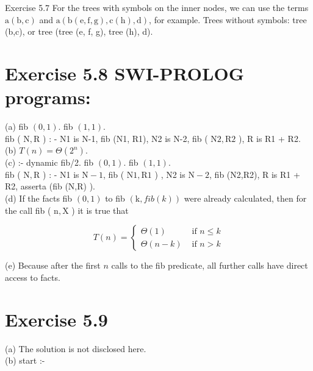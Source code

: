 \documentclass[10pt]{article}
\begin{document}
Exercise 5.7 For the trees with symbols on the inner nodes, we can use the terms $\mathrm{a}(\mathrm{b}, \mathrm{c})$ and $\mathrm{a}(\mathrm{b}(\mathrm{e}, \mathrm{f}, \mathrm{g}), \mathrm{c}(\mathrm{h}), \mathrm{d})$, for example. Trees without symbols: tree (b,c), or tree (tree (e, f, g), tree (h), d).

\section*{Exercise 5.8 SWI-PROLOG programs:}
(a) fib $(0,1)$. fib $(1,1)$.\\
fib ( $\mathrm{N}, \mathrm{R}$ ) : - N1 is N-1, fib (N1, R1), N2 is N-2, fib ( $\mathrm{N} 2, \mathrm{R} 2$ ), R is R1 + R2.\\
(b) $T(n)=\Theta\left(2^{n}\right)$.\\
(c) :- dynamic fib/2. fib $(0,1)$. fib $(1,1)$.\\
fib ( $\mathrm{N}, \mathrm{R}$ ) : - N1 is $\mathrm{N}-1$, fib ( $\mathrm{N} 1, \mathrm{R} 1$ ) , N2 is $\mathrm{N}-2$, fib (N2,R2), R is R1 + R2, asserta (fib (N,R) ).\\
(d) If the facts fib $(0,1)$ to fib $(\mathrm{k}, f i b(k))$ were already calculated, then for the call fib ( $\mathrm{n}, \mathrm{X}$ ) it is true that

$$
T(n)= \begin{cases}\Theta(1) & \text { if } n \leq k \\ \Theta(n-k) & \text { if } n>k\end{cases}
$$

(e) Because after the first $n$ calls to the fib predicate, all further calls have direct access to facts.

\section*{Exercise 5.9}
(a) The solution is not disclosed here.\\
(b) start :-
\end{document}
